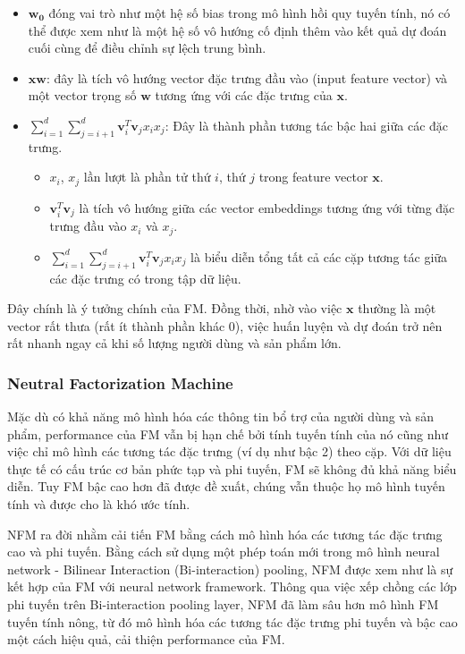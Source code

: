 \begin{itemize}
    \item $\mathbf{w_0}$ đóng vai trò như một hệ số bias trong mô hình hồi quy tuyến tính, 
    nó có thể được xem như là một hệ số vô hướng cố định thêm vào kết quả dự đoán cuối cùng để điều chỉnh sự lệch trung bình.
    \item $\mathbf{xw}$: đây là tích vô hướng vector đặc trưng đầu vào (input feature vector) 
    và một vector trọng số $\mathbf{w}$ tương ứng với các đặc trưng của $\mathbf{x}$.
    \item $\sum_{i=1}^{d}\sum_{j=i+1}^{d} \mathbf{v}_i^T\mathbf{v}_jx_ix_j$: Đây là thành phần tương tác bậc hai giữa các đặc trưng.
    \begin{itemize}
        \item $x_i$, $x_j$ lần lượt là phần tử thứ $i$, thứ $j$ trong feature vector $\mathbf{x}$.
        \item $\mathbf{v}_i^T\mathbf{v}_j$ là tích vô hướng giữa các vector embeddings tương ứng với từng đặc trưng đầu vào $x_i$ và $x_j$.
        \item $\sum_{i=1}^{d}\sum_{j=i+1}^{d} \mathbf{v}_i^T\mathbf{v}_jx_ix_j$ là biểu diễn tổng tất cả các cặp tương tác giữa các đặc trưng có trong tập dữ liệu.    
    \end{itemize}
\end{itemize}

Đây chính là ý tưởng chính của FM. Đồng thời, nhờ vào việc $\mathbf{x}$ thường là một vector rất thưa (rất ít thành phần khác 0), 
việc huấn luyện và dự đoán trở nên rất nhanh ngay cả khi số lượng người dùng và sản phẩm lớn.

\subsubsection{Neutral Factorization Machine}
Mặc dù có khả năng mô hình hóa các thông tin bổ trợ của người dùng và sản phẩm, performance của FM vẫn bị hạn chế 
bởi tính tuyến tính của nó cũng như việc chỉ mô hình các tương tác đặc trưng (ví dụ như bậc 2) theo cặp. 
Với dữ liệu thực tế có cấu trúc cơ bản phức tạp và phi tuyến, FM sẽ không đủ khả năng biểu diễn. 
Tuy FM bậc cao hơn đã được đề xuất, chúng vẫn thuộc họ mô hình tuyến tính và được cho là khó ước tính.

\indent NFM ra đời nhằm cải tiến FM bằng cách mô hình hóa các tương tác đặc trưng cao và phi tuyến. 
Bằng cách sử dụng một phép toán mới trong mô hình neural network - Bilinear Interaction (Bi-interaction) pooling, 
NFM được xem như là sự kết hợp của FM với neural network framework. Thông qua việc xếp chồng các lớp phi tuyến trên Bi-interaction pooling layer, 
NFM đã làm sâu hơn mô hình FM tuyến tính nông, từ đó mô hình hóa các tương tác đặc trưng phi tuyến và bậc cao một cách hiệu quả, cải thiện performance của FM.

